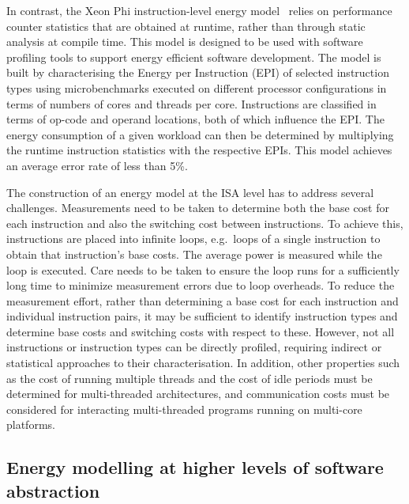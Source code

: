 In contrast, the Xeon Phi instruction-level energy model~\cite{phimodel} relies
on performance counter statistics that are obtained at runtime, rather than
through static analysis at compile time. This model is designed to be used with
software profiling tools to support energy efficient software development. The
model is built by characterising the Energy per Instruction (EPI) of selected
instruction types using microbenchmarks executed on different processor
configurations in terms of numbers of cores and threads per core. Instructions are classified in terms of op-code and operand locations, both of which influence the EPI.
%
The energy consumption of a given workload can then be determined by
multiplying the runtime instruction statistics with the respective EPIs.
%
This model achieves an average error rate of less than 5\%.




The construction of an energy model at the ISA level has to address several
challenges.
%
Measurements need to be taken to determine both the base cost for each
instruction and also the switching cost between instructions. To achieve this,
instructions are placed into infinite loops, e.g.\ loops of a single
instruction to obtain that instruction's base costs. The average power is
measured while the loop is executed. Care needs to be taken to ensure the loop
runs for a sufficiently long time to minimize measurement errors due to loop
overheads. 
%
To reduce the measurement effort, rather than determining a base cost for each instruction and individual instruction pairs, it may be sufficient to identify instruction types and determine base costs and switching costs with respect to these. 
%
However, not all instructions or instruction types can be directly profiled,
requiring indirect or statistical approaches to their characterisation. 
%
In addition, other properties such as the cost of running multiple threads and
the cost of idle periods must be determined for multi-threaded architectures, and communication costs must be considered for interacting multi-threaded programs running on multi-core platforms. 


\subsection{Energy modelling at higher levels of software abstraction}
\label{subsec:mapping}

